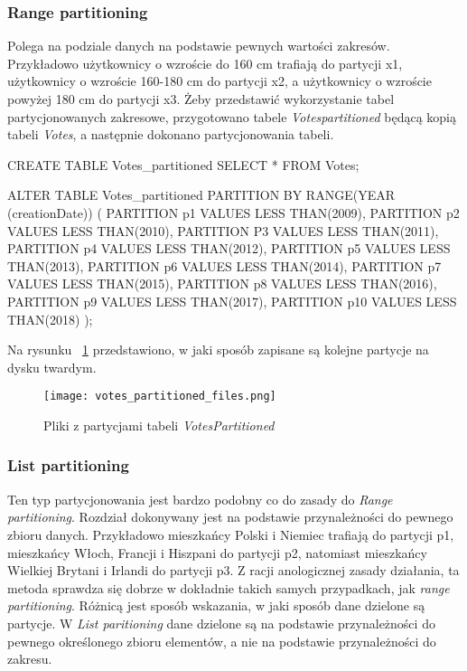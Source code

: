\subsubsection{Range partitioning}
Polega na podziale danych na podstawie pewnych wartości zakresów. Przykładowo użytkownicy o wzroście do 160 cm trafiają do partycji x1, użytkownicy o wzroście 160-180 cm do partycji x2, a użytkownicy o wzroście powyżej 180 cm do partycji x3.
Żeby przedstawić wykorzystanie tabel partycjonowanych zakresowe, przygotowano tabele \textit{Votes\textunderscore partitioned} będącą kopią tabeli \textit{Votes}, a następnie dokonano partycjonowania tabeli.
\begin{spverbatim}
	CREATE TABLE Votes_partitioned SELECT * FROM Votes;
\end{spverbatim}
\begin{spverbatim}
	ALTER TABLE Votes_partitioned PARTITION BY RANGE(YEAR (creationDate)) (
	PARTITION p1 VALUES LESS THAN(2009),
	PARTITION p2 VALUES LESS THAN(2010),
	PARTITION P3 VALUES LESS THAN(2011),
	PARTITION p4 VALUES LESS THAN(2012),
	PARTITION p5 VALUES LESS THAN(2013),
	PARTITION p6 VALUES LESS THAN(2014),
	PARTITION p7 VALUES LESS THAN(2015),
	PARTITION p8 VALUES LESS THAN(2016),
	PARTITION p9 VALUES LESS THAN(2017),
	PARTITION p10 VALUES LESS THAN(2018)
	);
\end{spverbatim}
Na rysunku ~\ref{fig:votes_partitioned_files} przedstawiono, w jaki sposób zapisane są kolejne partycje na dysku twardym.

\begin{figure}
	\caption{Pliki z partycjami tabeli \textit{Votes\textunderscore Partitioned}}
	\centering
	\texttt{[image: votes\_partitioned\_files.png]}
	\label{fig:votes_partitioned_files}
\end{figure}

\subsubsection{List partitioning}
Ten typ partycjonowania jest bardzo podobny co do zasady do \textit{Range partitioning}. Rozdział dokonywany jest na podstawie przynależności do pewnego zbioru danych. Przykładowo mieszkańcy Polski i Niemiec trafiają do partycji p1, mieszkańcy Włoch, Francji i Hiszpani do partycji p2, natomiast mieszkańcy Wielkiej Brytani i Irlandi do partycji p3. Z racji anologicznej zasady działania, ta metoda sprawdza się dobrze w dokładnie takich samych przypadkach, jak \textit{range partitioning}. Różnicą jest sposób wskazania, w jaki sposób dane dzielone są partycje. W \textit{List paritioning} dane dzielone są na podstawie przynależności do pewnego określonego zbioru elementów, a nie na podstawie przynależności do zakresu.
